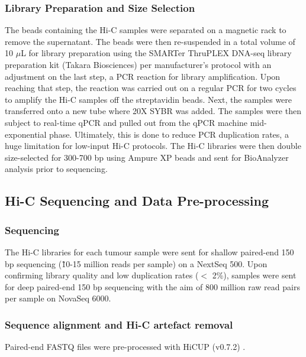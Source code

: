 \subsubsection{Library Preparation and Size Selection}

The beads containing the Hi-C samples were separated on a magnetic rack to remove the supernatant.
The beads were then re-suspended in a total volume of 10 $\mu$L for library preparation using the SMARTer ThruPLEX DNA-seq library preparation kit (Takara Biosciences) per manufacturer's protocol with an adjustment on the last step, a PCR reaction for library amplification.
Upon reaching that step, the reaction was carried out on a regular PCR for two cycles to amplify the Hi-C samples off the streptavidin beads.
Next, the samples were transferred onto a new tube where 20X SYBR was added.
The samples were then subject to real-time qPCR and pulled out from the qPCR machine mid-exponential phase.
Ultimately, this is done to reduce PCR duplication rates, a huge limitation for low-input Hi-C protocols.
The Hi-C libraries were then double size-selected for 300-700 bp using Ampure XP beads and sent for BioAnalyzer analysis prior to sequencing.

\subsection{Hi-C Sequencing and Data Pre-processing}

\subsubsection{Sequencing}

The Hi-C libraries for each tumour sample were sent for shallow paired-end 150 bp sequencing (\~10-15 million reads per sample) on a NextSeq 500.
Upon confirming library quality and low duplication rates ($<$ 2\%), samples were sent for deep paired-end 150 bp sequencing with the aim of 800 million raw read pairs per sample on NovaSeq 6000.

\subsubsection{Sequence alignment and Hi-C artefact removal}

Paired-end FASTQ files were pre-processed with HiCUP (v0.7.2) \cite{wingettHiCUPPipelineMapping2015}.

